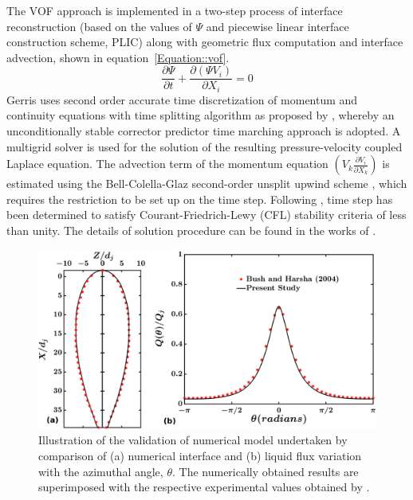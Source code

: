 \documentclass[%
 aip,
 sd,%
amsmath,amssymb,
preprint,%
author-year,%
]{revtex4-1}
\begin{document}
The VOF approach is implemented in a two-step process of interface reconstruction (based on the values of $\Psi$ and piecewise linear interface construction scheme, PLIC) along with geometric flux computation and interface advection, shown in equation~\ref{Equation::vof}.
\begin{equation} \label{Equation::vof}
\frac{\partial \Psi}{\partial t} + \frac{\partial(\Psi V_i)}{\partial X_i} = 0
\end{equation}
Gerris uses second order accurate time discretization of momentum and continuity equations with time splitting algorithm as proposed by \cite{Chorin1968}, whereby an unconditionally stable corrector predictor time marching approach is adopted. A multigrid solver is used for the solution of the resulting pressure-velocity coupled Laplace equation. The advection term of the momentum equation $\left(V_k\frac{\partial V_i}{\partial X_k}\right)$ is estimated using the Bell-Colella-Glaz second-order unsplit upwind scheme \citep{bell1989second}, which requires the restriction to be set up on the time step. Following \cite{popinet2009}, time step has been determined to satisfy Courant-Friedrich-Lewy (CFL) stability criteria of less than unity. The details of solution procedure can be found in the works of \cite{Popinet2003,popinet2009}.\\
\begin{figure}
	\centering
	\includegraphics[width=\linewidth]{Figure3}
	\caption{Illustration of the validation of numerical model undertaken by comparison of (a) numerical interface and (b) liquid flux variation with the azimuthal angle, $\theta$. The numerically obtained results are superimposed with the respective experimental values obtained by \cite{bush2004collision}.}
	\label{Figure::validation}
\end{figure}
\end{document}
